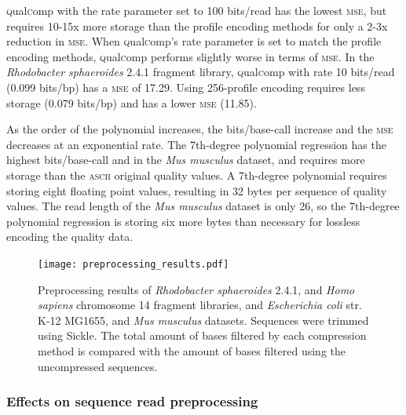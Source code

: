 \textsc{q}ual\textsc{c}omp with the rate parameter set to 100 bits/read has the lowest
\textsc{mse}, but requires 10-15x more storage than the profile
encoding methods for only a 2-3x reduction in \textsc{mse}. When
\textsc{q}ual\textsc{c}omp's rate parameter is set to match the profile encoding
methods, \textsc{q}ual\textsc{c}omp performs slightly worse in terms of \textsc{mse}.
In the \textit{Rhodobacter sphaeroides} 2.4.1 fragment library,
\textsc{q}ual\textsc{c}omp with rate 10 bits/read (0.099 bits/bp) has a \textsc{mse} of
17.29. Using 256-profile encoding requires less storage (0.079
bits/bp) and has a lower \textsc{mse} (11.85).

As the order of the polynomial increases, the bits/base-call increase
and the \textsc{mse} decreases at an exponential rate. The 7th-degree
polynomial regression has the highest bits/base-call and in the
\textit{Mus musculus} dataset, and requires more storage than the
\textsc{ascii} original quality values. A 7th-degree polynomial
requires storing eight floating point values, resulting in 32 bytes
per sequence of quality values. The read length of the \textit{Mus musculus}
dataset is only 26, so the 7th-degree polynomial regression is storing
six more bytes than necessary for lossless encoding the quality data.

\begin{figure}[!htb]%
\begin{center}
\texttt{[image: preprocessing\_results.pdf]}
\end{center}
\renewcommand{\baselinestretch}{1}
\small\normalsize
\begin{quote}
\caption[Preprocessing results of \textit{Rhodobacter sphaeroides}
  2.4.1, and \textit{Homo sapiens} chromosome 14 fragment libraries,
  and \textit{Escherichia coli} str. K-12 MG1655, and \textit{Mus
    musculus} datasets]{Preprocessing results of \textit{Rhodobacter sphaeroides}
  2.4.1, and \textit{Homo sapiens} chromosome 14 fragment libraries,
  and \textit{Escherichia coli} str. K-12 MG1655, and \textit{Mus
    musculus} datasets. Sequences were trimmed using Sickle. The
  total amount of bases filtered by each compression method is
  compared with the amount of bases filtered using the uncompressed
  sequences.}
  \label{fig:preprocessing}
\end{quote}
\end{figure}
\renewcommand{\baselinestretch}{2}
\small\normalsize

\subsubsection{Effects on sequence read preprocessing}

